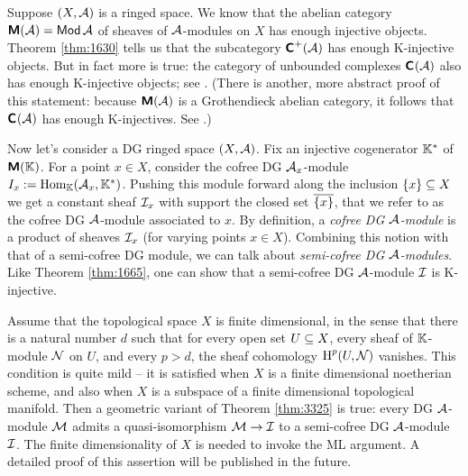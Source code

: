 \begin{rem} \label{rem:4676}
Suppose $(X, \AA)$ is a ringed space. We know that the abelian category 
$\dcat{M}(\AA) = \cat{Mod} \AA$ of sheaves of $\AA$-modules on $X$ has 
enough injective objects. Theorem \ref{thm:1630} tells us that the subcategory 
$\dcat{C}^{+}(\AA)$ has enough K-injective objects. But in fact more is true: 
the category of unbounded complexes $\dcat{C}^{}(\AA)$ also has enough 
K-injective objects; see \cite{Spa}. (There is another, more abstract proof of 
this statement: because $\dcat{M}(\AA)$ is a Grothendieck abelian category, it 
follows that $\dcat{C}^{}(\AA)$ has enough K-injectives. See 
\cite[Corollary 14.1.8]{KaSc2}.)

Now let's consider a DG ringed space $(X, \AA)$. Fix an injective cogenerator 
$\K^*$ of $\dcat{M}(\K)$. 
For a point $x \in X$, consider the cofree DG $\AA_x$-module 
$I_x := \opn{Hom}_{\K}(\AA_x, \K^*)$.
Pushing this module forward along the inclusion $\{ x \} \sub X$ we get a 
constant sheaf $\II_x$ with support the closed set 
$\ol{\{ x \}}$, that we refer to as the cofree DG $\AA$-module 
associated to $x$. By definition, a {\em cofree DG $\AA$-module} is a product 
of sheaves $\II_x$ (for varying points $x \in X$).  
Combining this notion with that of a semi-cofree DG module, we can talk about 
{\em semi-cofree DG  $\AA$-modules}. Like Theorem \ref{thm:1665}, one can show 
that a semi-cofree DG  $\AA$-module $\II$ is K-injective. 

Assume that the topological space $X$ is finite dimensional, in the sense that 
there is a natural number $d$ such that for every open set $U \sub X$, every 
sheaf of $\K$-module $\NN$ on $U$, and every $p > d$, the sheaf cohomology
$\opn{H}^p(U, \NN)$ vanishes. 
This condition is quite mild -- it is satisfied when $X$ is a finite 
dimensional noetherian scheme, and also when $X$ is a subspace of a finite 
dimensional topological manifold. 
Then a geometric variant of Theorem \ref{thm:3325} is 
true: every DG  $\AA$-module $\MM$ admits a quasi-isomorphism 
$\MM \to \II$ to a semi-cofree DG  $\AA$-module $\II$.
The finite dimensionality of $X$ is needed to invoke the ML argument. 
A detailed proof of this assertion will be published in the future. 
\end{rem}





\cleardoublepage
{} 
\label{sec:adj-equ-cohdim}

